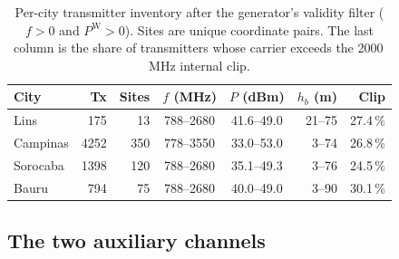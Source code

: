 \begin{table}[!t]
\caption{Per-city transmitter inventory after the generator's validity
filter ($f>0$ and $P^{\mathrm{W}}>0$). Sites are unique coordinate pairs.
The last column is the share of transmitters whose carrier exceeds the
2000\,MHz internal clip.}
\label{tab:app-antenna-inventory}
\centering
\footnotesize
\setlength{\tabcolsep}{4pt}
\begin{tabular}{@{}lrrccrr@{}}
\toprule
City & Tx & Sites & $f$ (MHz) & $P$ (dBm) & $h_{b}$ (m) & Clip \\
\midrule
Lins     &  175 &  13 & 788--2680 & 41.6--49.0 & 21--75 & 27.4\,\% \\
Campinas & 4252 & 350 & 778--3550 & 33.0--53.0 &  3--74 & 26.8\,\% \\
Sorocaba & 1398 & 120 & 788--2680 & 35.1--49.3 &  3--76 & 24.5\,\% \\
Bauru    &  794 &  75 & 788--2680 & 40.0--49.0 &  3--90 & 30.1\,\% \\
\bottomrule
\end{tabular}
\end{table}

\subsection{The two auxiliary channels}

